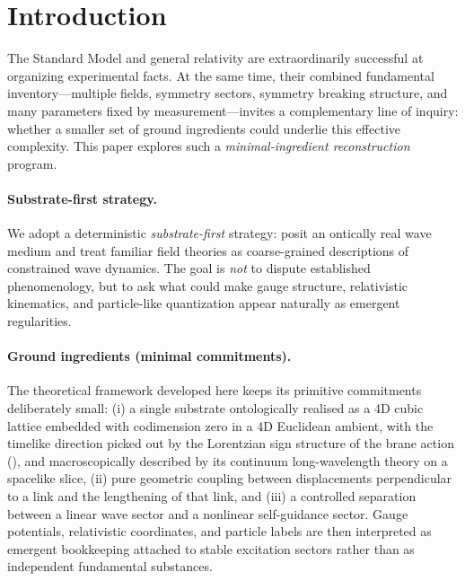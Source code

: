 \section{Introduction}
\label{sec:introduction}

The Standard Model and general relativity are extraordinarily successful at organizing experimental facts.
At the same time, their combined fundamental inventory---multiple fields, symmetry sectors, symmetry breaking
structure, and many parameters fixed by measurement---invites a complementary line of inquiry:
whether a smaller set of ground ingredients could underlie this effective complexity.
This paper explores such a \emph{minimal-ingredient reconstruction} program.

\paragraph{Substrate-first strategy.}
We adopt a deterministic \emph{substrate-first} strategy: posit an ontically real wave medium and treat familiar
field theories as coarse-grained descriptions of constrained wave dynamics.
The goal is \emph{not} to dispute established phenomenology, but to ask what could make gauge structure,
relativistic kinematics, and particle-like quantization appear naturally as emergent regularities.

\paragraph{Ground ingredients (minimal commitments).}
The theoretical framework developed here keeps its primitive commitments deliberately small:
(i) a single substrate ontologically realised as a 4D cubic lattice embedded with codimension zero in a 4D Euclidean ambient, with the timelike direction picked out by the Lorentzian sign structure of the brane action (), and macroscopically described by its continuum long-wavelength theory on a spacelike slice,
(ii) pure geometric coupling between displacements perpendicular to a link and the lengthening of that link,
and (iii) a controlled separation between a linear wave sector and a nonlinear self-guidance sector.
Gauge potentials, relativistic coordinates, and particle labels are then interpreted as emergent bookkeeping attached to
stable excitation sectors rather than as independent fundamental substances.

